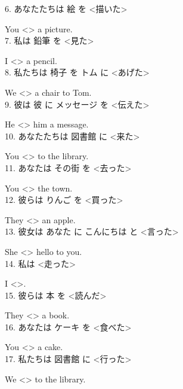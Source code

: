 \documentclass[uplatex,
paper=a4,
fontsize=18pt,
jafontsize=16pt,
number_of_lines=30,
line_length=30zh,
baselineskip=25pt,
]{jlreq}
\begin{document}
6.  あなたたちは 絵 を <描いた>

  You <\hspace{3em}> a picture.
\\

7.  私は 鉛筆 を <見た>

  I <\hspace{3em}> a pencil.
\\

8.  私たちは 椅子 を トム に <あげた>

  We <\hspace{3em}> a chair to Tom.
\\

9.  彼は 彼 に メッセージ を <伝えた>

  He <\hspace{3em}> him a message.
\\

10.  あなたたちは 図書館 に <来た>

  You <\hspace{3em}> to the library.
\\

11.  あなたは その街 を <去った>

  You <\hspace{3em}> the town.
\\

12.  彼らは りんご を <買った>

  They <\hspace{3em}> an apple.
\\

13.  彼女は あなた に こんにちは と <言った>

  She <\hspace{3em}> hello to you.
\\

14.  私は <走った>

  I <\hspace{3em}>.
\\

15.  彼らは 本 を <読んだ>

  They <\hspace{3em}> a book.
\\

16.  あなたは ケーキ を <食べた>

  You <\hspace{3em}> a cake.
\\

17.  私たちは 図書館 に <行った>

  We <\hspace{3em}> to the library.
\\
\end{document}
